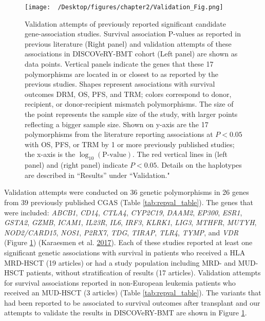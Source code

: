 \documentclass[]{DissertateOSU}
\begin{document}
\begin{figure}
    \centering
    \texttt{[image: ~/Desktop/figures/chapter2/Validation\_Fig.png]}
    \caption[Validation attempts of previously reported significant candidate gene-association studies.]{Validation attempts of previously reported significant candidate gene-association studies. Survival association P-values as reported in previous literature (Right panel) and validation attempts of these associations in DISCOVeRY-BMT cohort (Left panel) are shown as data points. Vertical panels indicate the genes that these 17 polymorphisms are located in or closest to as reported by the previous studies. Shapes represent associations with survival outcomes DRM, OS, PFS, and TRM; colors correspond to donor, recipient, or donor-recipient mismatch polymorphisms. The size of the point represents the sample size of the study, with larger points reflecting a bigger sample size. Shown on y-axis are the 17 polymorphisms from the literature reporting associations at $P < 0.05$ with OS, PFS, or TRM by 1 or more previously published studies; the x-axis is the $\log_{10}(\text{P-value})$. The red vertical lines in (left panel) and (right panel) indicate $P < 0.05$. Details on the haplotypes are described in “Results” under “Validation."}
    \label{fig:val_fig}
\end{figure}

Validation attempts were conducted on 36 genetic polymorphisms in 26
genes from 39 previously published CGAS (Table \ref{tab:repval_table}).
The genes that were included: \emph{ABCB1}, \emph{CD14}, \emph{CTLA4},
\emph{CYP2C19}, \emph{DAAM2}, \emph{EP300}, \emph{ESR1}, \emph{GSTA2},
\emph{GZMB}, \emph{ICAM1}, \emph{IL23R}, \emph{IL6}, \emph{IRF3},
\emph{KLRK1}, \emph{LIG3}, \emph{MTHFR}, \emph{MUTYH},
\emph{NOD2/CARD15}, \emph{NOS1}, \emph{P2RX7}, \emph{TDG}, \emph{TIRAP},
\emph{TLR4}, \emph{TYMP}, and \emph{VDR} (Figure \ref{fig:val_fig})
(Karaesmen et al. \protect\hyperlink{ref-Karaesmen_2017}{2017}). Each of
these studies reported at least one significant genetic associations
with survival in patients who received a HLA MRD-HSCT (19 articles) or
had a study population including MRD- and MUD-HSCT patients, without
stratification of results (17 articles). Validation attempts for
survival associations reported in non-European leukemia patients who
received an MUD-HSCT (3 articles) (Table \ref{tab:repval_table}). The
variants that had been reported to be associated to survival outcomes
after transplant and our attempts to validate the results in
DISCOVeRY-BMT are shown in Figure \ref{fig:val_fig}.
\end{document}
